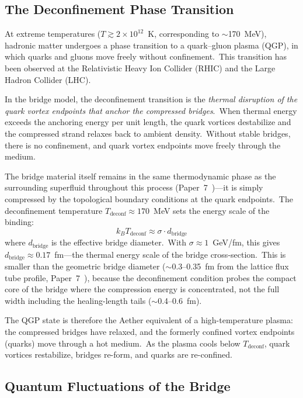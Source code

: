 ﻿\documentclass[12pt,letterpaper]{article}
\begin{document}
\subsection{The Deconfinement Phase Transition}

At extreme temperatures ($T \gtrsim 2 \times 10^{12}$~K, corresponding to
$\sim$170~MeV), hadronic matter undergoes a phase transition to a quark--gluon plasma
(QGP), in which quarks and gluons move freely without confinement.\ This transition
has been observed at the Relativistic Heavy Ion Collider (RHIC) and the Large Hadron
Collider (LHC).

In the bridge model, the deconfinement transition is the \emph{thermal disruption of
the quark vortex endpoints that anchor the compressed bridges}.\ When thermal energy
exceeds the anchoring energy per unit length, the quark vortices destabilize and the
compressed strand relaxes back to ambient density.\ Without stable bridges,
there is no confinement, and quark vortex endpoints move freely through the medium.

The bridge material itself remains in the same thermodynamic phase as the surrounding
superfluid throughout this process (Paper~7~\cite{otto-quantum})---it is
simply compressed by the topological boundary conditions at the quark endpoints.\
The deconfinement temperature
$T_{\mathrm{deconf}} \approx 170$~MeV sets the energy scale of the binding:
%
\begin{equation}
  k_B T_{\mathrm{deconf}} \approx \sigma \cdot d_{\mathrm{bridge}}
\end{equation}
%
where $d_{\mathrm{bridge}}$ is the effective bridge diameter.\ With
$\sigma \approx 1$~GeV/fm, this gives $d_{\mathrm{bridge}} \approx 0.17$~fm---the
thermal energy scale of the bridge cross-section.\ This is smaller than the
geometric bridge diameter ($\sim$0.3--0.35~fm from the lattice flux tube profile,
Paper~7~\cite{otto-quantum}), because the deconfinement condition probes
the compact core of the bridge where the compression energy is concentrated, not
the full width including the healing-length tails ($\sim$0.4--0.6~fm).

The QGP state is therefore the Aether equivalent of a high-temperature plasma:
the compressed bridges have relaxed, and the formerly confined vortex endpoints (quarks)
move through a hot medium.\ As the plasma cools below $T_{\mathrm{deconf}}$,
quark vortices restabilize, bridges re-form, and quarks are re-confined.


\subsection{Quantum Fluctuations of the Bridge}
\label{sec:bridge-fluctuations}
\end{document}
